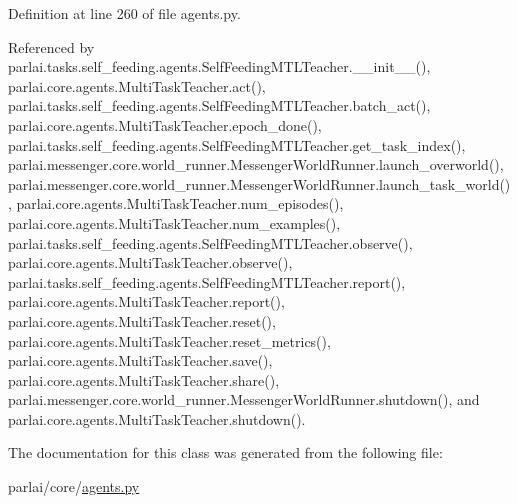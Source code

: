 Definition at line 260 of file agents.\+py.



Referenced by parlai.\+tasks.\+self\+\_\+feeding.\+agents.\+Self\+Feeding\+M\+T\+L\+Teacher.\+\_\+\+\_\+init\+\_\+\+\_\+(), parlai.\+core.\+agents.\+Multi\+Task\+Teacher.\+act(), parlai.\+tasks.\+self\+\_\+feeding.\+agents.\+Self\+Feeding\+M\+T\+L\+Teacher.\+batch\+\_\+act(), parlai.\+core.\+agents.\+Multi\+Task\+Teacher.\+epoch\+\_\+done(), parlai.\+tasks.\+self\+\_\+feeding.\+agents.\+Self\+Feeding\+M\+T\+L\+Teacher.\+get\+\_\+task\+\_\+index(), parlai.\+messenger.\+core.\+world\+\_\+runner.\+Messenger\+World\+Runner.\+launch\+\_\+overworld(), parlai.\+messenger.\+core.\+world\+\_\+runner.\+Messenger\+World\+Runner.\+launch\+\_\+task\+\_\+world(), parlai.\+core.\+agents.\+Multi\+Task\+Teacher.\+num\+\_\+episodes(), parlai.\+core.\+agents.\+Multi\+Task\+Teacher.\+num\+\_\+examples(), parlai.\+tasks.\+self\+\_\+feeding.\+agents.\+Self\+Feeding\+M\+T\+L\+Teacher.\+observe(), parlai.\+core.\+agents.\+Multi\+Task\+Teacher.\+observe(), parlai.\+tasks.\+self\+\_\+feeding.\+agents.\+Self\+Feeding\+M\+T\+L\+Teacher.\+report(), parlai.\+core.\+agents.\+Multi\+Task\+Teacher.\+report(), parlai.\+core.\+agents.\+Multi\+Task\+Teacher.\+reset(), parlai.\+core.\+agents.\+Multi\+Task\+Teacher.\+reset\+\_\+metrics(), parlai.\+core.\+agents.\+Multi\+Task\+Teacher.\+save(), parlai.\+core.\+agents.\+Multi\+Task\+Teacher.\+share(), parlai.\+messenger.\+core.\+world\+\_\+runner.\+Messenger\+World\+Runner.\+shutdown(), and parlai.\+core.\+agents.\+Multi\+Task\+Teacher.\+shutdown().



The documentation for this class was generated from the following file\+:\begin{DoxyCompactItemize}
\item 
parlai/core/\hyperlink{parlai_2core_2agents_8py}{agents.\+py}\end{DoxyCompactItemize}
